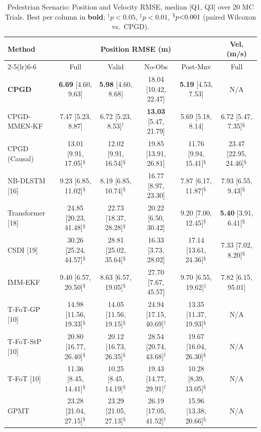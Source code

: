 \begin{table}[htbp]\centering
\caption{Pedestrian Scenario: Position and Velocity RMSE, median [Q1, Q3] over 20 MC Trials. Best per column in \textbf{bold}; $^{\dagger}p{<}0.05$, $^{\ddagger}p{<}0.01$, $^{\mathsection}p{<}0.001$ (paired Wilcoxon vs.\ CPGD).}
\label{tab:pedestrian_results}
\setlength{\tabcolsep}{4pt}
\centering\small\begin{tabular}{lccccc}
\toprule
\multirow{2}{*}{Method} & \multicolumn{4}{c}{Position RMSE (m)} & Vel. (m/s) \\
\cmidrule(lr){2-5}\cmidrule(lr){6-6}
& Full & Valid & No-Obs & Post-Mnv & Full \\
\midrule
\textbf{CPGD} & \textbf{6.69} [4.60, 9.63] & \textbf{5.98} [4.60, 8.68] & 18.04 [10.42, 22.47] & \textbf{5.19} [4.53, 7.53] & N/A \\
CPGD-MMEN-KF & 7.47 [5.23, 8.87] & 6.72 [5.23, 8.53]$^{\dagger}$ & \textbf{13.03} [5.47, 21.79] & 5.69 [5.18, 8.14] & 6.72 [5.47, 7.35]$^{\mathsection}$ \\
CPGD (Causal) & 13.01 [9.91, 17.05]$^{\mathsection}$ & 12.02 [9.91, 16.54]$^{\mathsection}$ & 19.85 [13.91, 26.81] & 11.76 [9.94, 15.41]$^{\mathsection}$ & 23.47 [22.95, 24.46]$^{\mathsection}$ \\
NB-DLSTM [16] & 9.23 [6.85, 11.02]$^{\mathsection}$ & 8.19 [6.85, 10.74]$^{\mathsection}$ & 16.77 [8.97, 23.30] & 7.87 [6.17, 11.87]$^{\mathsection}$ & 7.93 [6.55, 9.43]$^{\mathsection}$ \\
Transformer [18] & 24.85 [20.23, 41.48]$^{\mathsection}$ & 22.73 [18.37, 28.28]$^{\mathsection}$ & 20.22 [6.50, 30.42] & 9.20 [7.00, 12.45]$^{\mathsection}$ & \textbf{5.40} [3.91, 6.41]$^{\mathsection}$ \\
CSDI [19] & 30.26 [25.24, 44.57]$^{\mathsection}$ & 28.81 [25.02, 35.64]$^{\mathsection}$ & 16.33 [3.73, 28.02] & 17.14 [13.61, 24.36]$^{\mathsection}$ & 7.33 [7.02, 8.20]$^{\mathsection}$ \\
IMM-EKF & 9.40 [6.57, 20.50]$^{\mathsection}$ & 8.63 [6.57, 19.05]$^{\mathsection}$ & 27.70 [7.67, 45.57] & 9.70 [6.55, 19.62]$^{\ddagger}$ & 7.82 [6.15, 95.01] \\
T-FoT-GP [10] & 14.98 [11.56, 19.33]$^{\mathsection}$ & 14.05 [11.56, 19.15]$^{\mathsection}$ & 24.94 [17.15, 40.69]$^{\dagger}$ & 13.35 [11.37, 19.93]$^{\mathsection}$ & N/A \\
T-FoT-StP [10] & 20.80 [16.77, 26.40]$^{\mathsection}$ & 20.12 [16.73, 26.35]$^{\mathsection}$ & 28.54 [20.74, 43.68]$^{\ddagger}$ & 19.67 [16.04, 26.30]$^{\mathsection}$ & N/A \\
T-FoT [10] & 11.36 [8.45, 14.41]$^{\mathsection}$ & 10.25 [8.45, 14.19]$^{\mathsection}$ & 19.43 [14.77, 29.91]$^{\dagger}$ & 10.28 [8.39, 13.05]$^{\mathsection}$ & N/A \\
GPMT & 23.28 [21.04, 27.15]$^{\mathsection}$ & 23.29 [21.05, 27.13]$^{\mathsection}$ & 26.19 [17.05, 41.52]$^{\ddagger}$ & 15.96 [13.38, 20.66]$^{\mathsection}$ & N/A \\
\bottomrule
\end{tabular}
\end{table}
